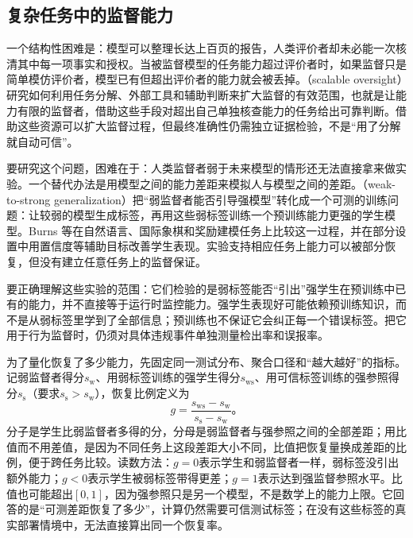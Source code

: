 \subsection{复杂任务中的监督能力}
\label{sec:alignment-oversight-capacity}

一个结构性困难是：模型可以整理长达上百页的报告，人类评价者却未必能一次核清其中每一项事实和授权。当被监督模型的任务能力超过评价者时，如果监督只是简单模仿评价者，模型已有但超出评价者的能力就会被丢掉。（scalable oversight）研究如何利用任务分解、外部工具和辅助判断来扩大监督的有效范围，也就是让能力有限的监督者，借助这些手段对超出自己单独核查能力的任务给出可靠判断。借助这些资源可以扩大监督过程，但最终准确性仍需独立证据检验，不是“用了分解就自动可信”。

要研究这个问题，困难在于：人类监督者弱于未来模型的情形还无法直接拿来做实验。一个替代办法是用模型之间的能力差距来模拟人与模型之间的差距。（weak-to-strong generalization）把“弱监督者能否引导强模型”转化成一个可测的训练问题：让较弱的模型生成标签，再用这些弱标签训练一个预训练能力更强的学生模型。Burns 等在自然语言、国际象棋和奖励建模任务上比较这一过程，并在部分设置中用置信度等辅助目标改善学生表现。实验支持相应任务上能力可以被部分恢复，但没有建立任意任务上的监督保证。

要正确理解这些实验的范围：它们检验的是弱标签能否“引出”强学生在预训练中已有的能力，并不直接等于运行时监控能力。强学生表现好可能依赖预训练知识，而不是从弱标签里学到了全部信息；预训练也不保证它会纠正每一个错误标签。把它用于行为监督时，仍须对具体违规事件单独测量检出率和误报率。

为了量化恢复了多少能力，先固定同一测试分布、聚合口径和“越大越好”的指标。记弱监督者得分$s_{\mathrm w}$、用弱标签训练的强学生得分$s_{\mathrm{ws}}$、用可信标签训练的强参照得分$s_{\mathrm s}$（要求$s_{\mathrm s}>s_{\mathrm w}$），恢复比例定义为
\begin{equation}
 g=\frac{s_{\mathrm{ws}}-s_{\mathrm{w}}}
          {s_{\mathrm{s}}-s_{\mathrm{w}}}\text{。}
 \label{eq:alignment-weak-strong-recovery}
\end{equation}
分子是学生比弱监督者多得的分，分母是弱监督者与强参照之间的全部差距；用比值而不用差值，是因为不同任务上这段差距大小不同，比值把恢复量换成差距的比例，便于跨任务比较。读数方法：$g=0$表示学生和弱监督者一样，弱标签没引出额外能力；$g<0$表示学生被弱标签带得更差；$g=1$表示达到强监督参照水平。比值也可能超出$[0,1]$，因为强参照只是另一个模型，不是数学上的能力上限。它回答的是“可测差距恢复了多少”，计算仍然需要可信测试标签；在没有这些标签的真实部署情境中，无法直接算出同一个恢复率。

